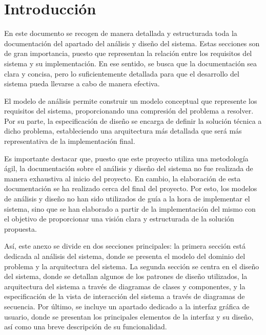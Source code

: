 \chapter{Introducción}
\label{anexo2:cap:introduccion}
En este documento se recogen de manera detallada y estructurada toda la documentación del apartado
del análisis y diseño del sistema. Estas secciones son de gran importancia, puesto que representan
la relación entre los requisitos del sistema y su implementación. En ese sentido, se busca que la
documentación sea clara y concisa, pero lo suficientemente detallada para que el desarrollo del
sistema pueda llevarse a cabo de manera efectiva.

El modelo de análisis permite construir un modelo conceptual que represente los requisitos del
sistema, proporcionando una compresión del problema a resolver. Por su parte, la especificación de
diseño se encarga de definir la solución técnica a dicho problema, estableciendo una arquitectura
más detallada que será más representativa de la implementación final.

Es importante destacar que, puesto que este proyecto utiliza una metodología ágil, la documentación
sobre el análisis y diseño del sistema no fue realizada de manera exhaustiva al inicio del proyecto.
En cambio, la elaboración de esta documentación se ha realizado cerca del final del proyecto. Por esto,
los modelos de análisis y diseño no han sido utilizados de guía a la hora de implementar el sistema,
sino que se han elaborado a partir de la implementación del mismo con el objetivo de proporcionar
una visión clara y estructurada de la solución propuesta.

Así, este anexo se divide en dos secciones principales: la primera sección está dedicada al análisis del
sistema, donde se presenta el modelo del dominio del problema y la arquitectura del sistema. La segunda
sección se centra en el diseño del sistema, donde se detallan algunos de los patrones de diseño utilizados,
la arquitectura del sistema a través de diagramas de clases y componentes, y la especificación de la
vista de interacción del sistema a través de diagramas de secuencia.
Por último, se incluye un apartado dedicado a la interfaz gráfica de usuario, donde se presentan los
principales elementos de la interfaz y su diseño, así como una breve descripción de su funcionalidad.

